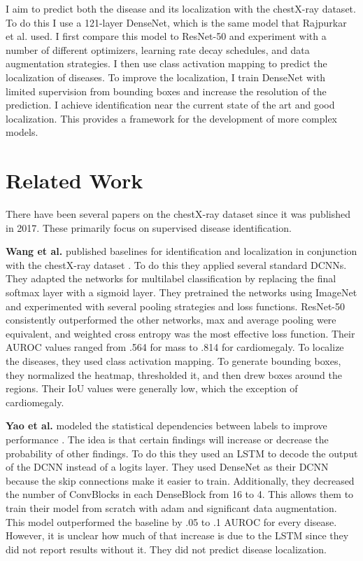 \documentclass{article}
\begin{document}
I aim to predict both the disease and its localization with the chestX-ray dataset. To do this I use a 121-layer DenseNet, which is the same model that Rajpurkar et al. used. I first compare this model to ResNet-50 and experiment with a number of different optimizers, learning rate decay schedules, and data augmentation strategies. I then use class activation mapping to predict the localization of diseases. To improve the localization, I train DenseNet with limited supervision from bounding boxes and increase the resolution of the prediction. I achieve identification near the current state of the art and good localization. This provides a framework for the development of more complex models.

\section{Related Work}
\label{Related Work}

There have been several papers on the chestX-ray dataset since it was published in 2017.
These primarily focus on supervised disease identification.

{\bf Wang et al.} published baselines for identification and localization in conjunction with the chestX-ray dataset \cite{Wang}. To do this they applied several standard DCNNs. They adapted the networks for multilabel classification by replacing the final softmax layer with a sigmoid layer. They pretrained the networks using ImageNet and experimented with several pooling strategies and loss functions. ResNet-50 consistently outperformed the other networks, max and average pooling were equivalent, and weighted cross entropy was the most effective loss function. Their AUROC values ranged from .564 for mass to .814 for cardiomegaly. To localize the diseases, they used class activation mapping. To generate bounding boxes, they normalized the heatmap, thresholded it, and then drew boxes around the regions. Their IoU values were generally low, which the exception of cardiomegaly.

{\bf Yao et al.} modeled the statistical dependencies between labels to improve performance \cite{Yao}. The idea is that certain findings will increase or decrease the probability of other findings. To do this they used an LSTM to decode the output of the DCNN instead of a logits layer. They used DenseNet as their DCNN because the skip connections make it easier to train. Additionally, they decreased the number of ConvBlocks in each DenseBlock from 16 to 4. This allows them to train their model from scratch with adam and significant data augmentation. This model outperformed the baseline by .05 to .1 AUROC for every disease. However, it is unclear how much of that increase is due to the LSTM since they did not report results without it. They did not predict disease localization.
\end{document}
